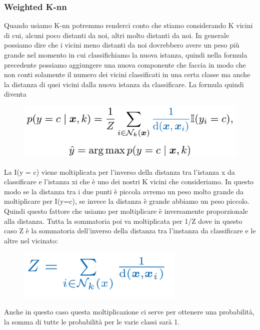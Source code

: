 \documentclass[14pt]{extreport}
\begin{document}
\subsubsection{Weighted K-nn} 
Quando usiamo K-nn potremmo renderci conto che stiamo considerando K vicini di cui, alcuni poco distanti da noi, altri molto distanti da noi.
In generale possiamo dire che i vicini meno distanti da noi dovrebbero avere un peso più grande nel momento in cui classifichiamo la nuova istanza, quindi nella formula precedente possiamo aggiungere una nuova componente che faccia in modo che non conti solamente il numero dei vicini classificati in una certa classe ma anche la distanza di quei vicini dalla nuova istanza da classificare.
La formula quindi diventa


\begin{figure}[H] 
	\centering
	\includegraphics[width=0.7\linewidth]{451.jpeg}
	\end{figure}

	La I(y = c) viene moltiplicata per l’inverso della distanza tra l’istanza x da classificare e l’istanza xi che è uno dei nostri K vicini che consideriamo.
	In questo modo se la distanza tra i due punti è piccola avremo un peso molto grande da moltiplicare per I(y=c), se invece la distanza è grande abbiamo un peso piccolo.
	Quindi questo fattore che usiamo per moltiplicare è inversamente proporzionale alla distanza.
	Tutta la sommatoria poi va moltiplicata per 1/Z dove in questo caso Z è la sommatoria dell’inverso della distanza tra l’instanza da classificare e le altre nel vicinato:


\begin{figure}[H] 
	\centering
	\includegraphics[width=0.7\linewidth]{452.jpeg}
	\end{figure}

	Anche in questo caso questa moltiplicazione ci serve per ottenere una probabilità, la somma di tutte le probabilità per le varie classi sarà 1.
\end{document}
